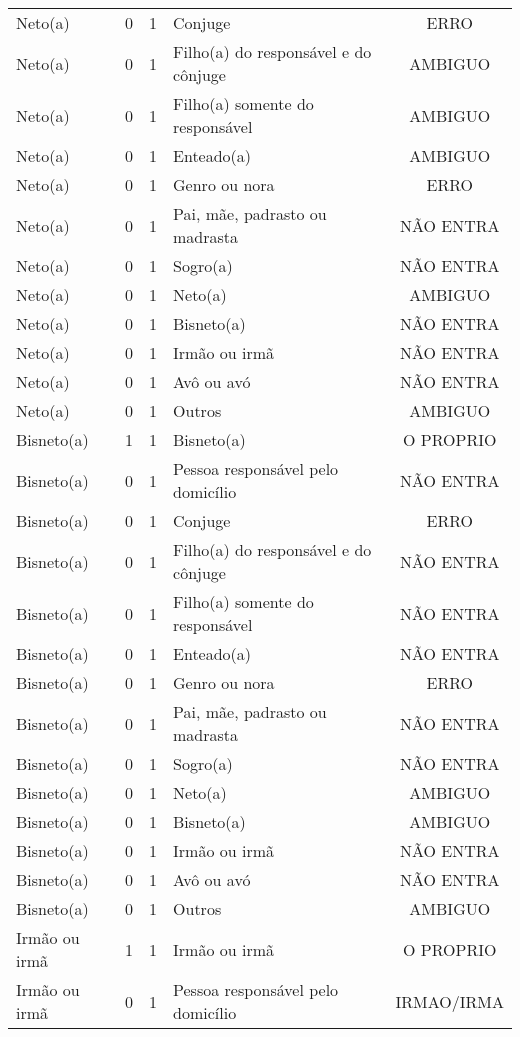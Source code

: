 \documentclass[
	12pt,				%
	openright,			%
	twoside,			%
	a4paper,			%
	english,			%
	french,				%
	spanish,			%
	brazil				%
	]{abntex2}
\begin{document}
\begin{anexosenv}
\begin{longtable}{@{}lcclc@{}}
				Neto(a) & 0 & 1 & Conjuge & ERRO \\
				Neto(a) & 0 & 1 & Filho(a) do responsável e do cônjuge & AMBIGUO \\
				Neto(a) & 0 & 1 & Filho(a) somente do responsável & AMBIGUO \\
				Neto(a) & 0 & 1 & Enteado(a) & AMBIGUO \\
				Neto(a) & 0 & 1 & Genro ou nora & ERRO \\
				Neto(a) & 0 & 1 & Pai, mãe, padrasto ou madrasta & NÃO ENTRA \\
				Neto(a) & 0 & 1 & Sogro(a) & NÃO ENTRA \\
				Neto(a) & 0 & 1 & Neto(a) & AMBIGUO \\
				Neto(a) & 0 & 1 & Bisneto(a) & NÃO ENTRA \\
				Neto(a) & 0 & 1 & Irmão ou irmã & NÃO ENTRA \\
				Neto(a) & 0 & 1 & Avô ou avó & NÃO ENTRA \\
				Neto(a) & 0 & 1 & Outros & AMBIGUO \\
				Bisneto(a) & 1 & 1 & Bisneto(a) & O PROPRIO \\
				Bisneto(a) & 0 & 1 & Pessoa responsável pelo domicílio & NÃO ENTRA \\
				Bisneto(a) & 0 & 1 & Conjuge & ERRO \\
				Bisneto(a) & 0 & 1 & Filho(a) do responsável e do cônjuge & NÃO ENTRA \\
				Bisneto(a) & 0 & 1 & Filho(a) somente do responsável & NÃO ENTRA \\
				Bisneto(a) & 0 & 1 & Enteado(a) & NÃO ENTRA \\
				Bisneto(a) & 0 & 1 & Genro ou nora & ERRO \\
				Bisneto(a) & 0 & 1 & Pai, mãe, padrasto ou madrasta & NÃO ENTRA \\
				Bisneto(a) & 0 & 1 & Sogro(a) & NÃO ENTRA \\
				Bisneto(a) & 0 & 1 & Neto(a) & AMBIGUO \\
				Bisneto(a) & 0 & 1 & Bisneto(a) & AMBIGUO \\
				Bisneto(a) & 0 & 1 & Irmão ou irmã & NÃO ENTRA \\
				Bisneto(a) & 0 & 1 & Avô ou avó & NÃO ENTRA \\
				Bisneto(a) & 0 & 1 & Outros & AMBIGUO \\
				Irmão ou irmã & 1 & 1 & Irmão ou irmã & O PROPRIO \\
				Irmão ou irmã & 0 & 1 & Pessoa responsável pelo domicílio & IRMAO/IRMA \\

\end{longtable}
\end{anexosenv}
\end{document}
